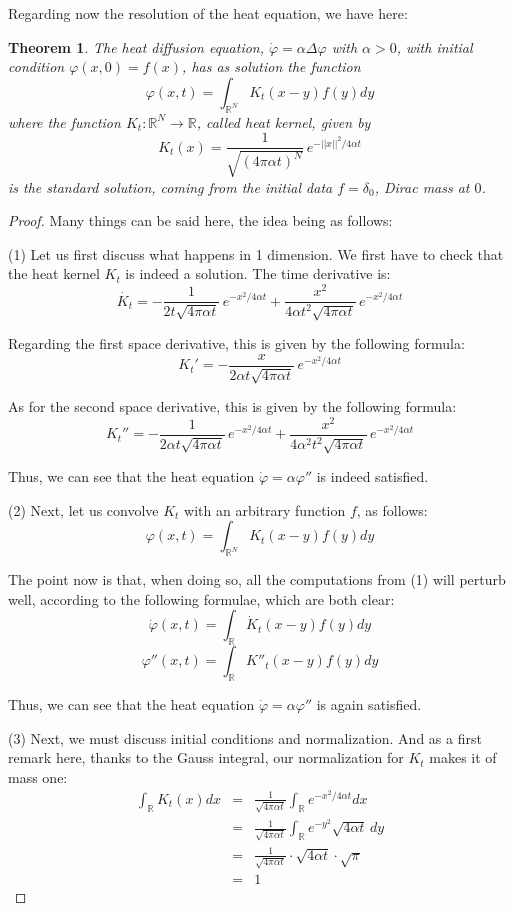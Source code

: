 \documentclass[12pt]{amsbook}
\newtheorem{theorem}{Theorem}[chapter]
\begin{document}
Regarding now the resolution of the heat equation, we have here:


\begin{theorem}
The heat diffusion equation, $\dot{\varphi}=\alpha\Delta\varphi$ with $\alpha>0$, with initial condition $\varphi(x,0)=f(x)$, has as solution the function
$$\varphi(x,t)=\int_{\mathbb R^N}K_t(x-y)f(y)dy$$
where the function $K_t:\mathbb R^N\to\mathbb R$, called heat kernel, given by
$$K_t(x)=\frac{1}{\sqrt{(4\pi\alpha t)^N}}\,e^{-||x||^2/4\alpha t}$$
is the standard solution, coming from the initial data $f=\delta_0$, Dirac mass at $0$.
\end{theorem}

\begin{proof}
Many things can be said here, the idea being as follows:

\medskip

(1) Let us first discuss what happens in 1 dimension. We first have to check that the heat kernel $K_t$ is indeed a solution. The time derivative is:
$$\dot{K_t}=-\frac{1}{2t\sqrt{4\pi\alpha t}}\,e^{-x^2/4\alpha t}+\frac{x^2}{4\alpha t^2\sqrt{4\pi\alpha t}}\,e^{-x^2/4\alpha t}$$

Regarding the first space derivative, this is given by the following formula:
$$K_t'=-\frac{x}{2\alpha t\sqrt{4\pi\alpha t}}\,e^{-x^2/4\alpha t}$$

As for the second space derivative, this is given by the following formula:
$$K_t''=-\frac{1}{2\alpha t\sqrt{4\pi\alpha t}}\,e^{-x^2/4\alpha t}+\frac{x^2}{4\alpha^2t^2\sqrt{4\pi\alpha t}}\,e^{-x^2/4\alpha t}$$

Thus, we can see that the heat equation $\dot{\varphi}=\alpha\varphi''$ is indeed satisfied.

\medskip

(2) Next, let us convolve $K_t$ with an arbitrary function $f$, as follows:
$$\varphi(x,t)=\int_{\mathbb R^N}K_t(x-y)f(y)dy$$

The point now is that, when doing so, all the computations from (1) will perturb well, according to the following formulae, which are both clear:
$$\dot{\varphi}(x,t)=\int_\mathbb R\dot{K}_t(x-y)f(y)dy$$
$$\varphi''(x,t)=\int_\mathbb RK''_t(x-y)f(y)dy$$

Thus, we can see that the heat equation $\dot{\varphi}=\alpha\varphi''$ is again satisfied. 

\medskip

(3) Next, we must discuss initial conditions and normalization. And as a first remark here, thanks to the Gauss integral, our normalization for $K_t$ makes it of mass one:
\begin{eqnarray*}
\int_\mathbb RK_t(x)dx
&=&\frac{1}{\sqrt{4\pi\alpha t}}\int_\mathbb Re^{-x^2/4\alpha t}dx\\
&=&\frac{1}{\sqrt{4\pi\alpha t}}\int_\mathbb Re^{-y^2}\sqrt{4\alpha t}\,dy\\
&=&\frac{1}{\sqrt{4\pi\alpha t}}\cdot \sqrt{4\alpha t}\cdot\sqrt{\pi}\\
&=&1
\end{eqnarray*}


\end{proof}
\end{document}
